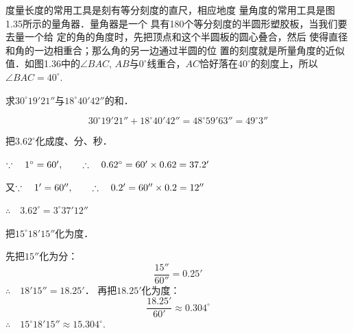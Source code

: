 度量长度的常用工具是刻有等分刻度的直尺，相应地度
量角度的常用工具是图1.35所示的量角器．量角器是一个
具有180个等分刻度的半圆形塑胶板，当我们要去量一个给
定的角的角度时，先把顶点和这个半圆板的圆心叠合，然后
使得直径和角的一边相重合；那么角的另一边通过半圆的位
置的刻度就是所量角度的近似值．如图1.36中的$\angle BAC$,
$AB$与$0^{\circ}$线重合，$AC$恰好落在$40^{\circ}$的刻度上，所以$\angle BAC=40^{\circ}$.

\begin{figure}[htp]
	\centering
{}	
	\caption{}
\end{figure}

\begin{example}
	求$30^{\circ}19'21''$与$18^{\circ}40'42''$的和．
\end{example}

\begin{solution}
\[30^{\circ}19'21''+18^{\circ}40'42''=48^{\circ}59'63''=49^{\circ}3''\]
\end{solution}

\begin{example}
	把$3.62^{\circ}$化成度、分、秒．
\end{example}

\begin{solution}
$\because\quad 1^{\circ}=60',\qquad \therefore\quad 0.62^{\circ}=60'\times 0.62=37.2'$

又$\because\quad 1'=60'',\qquad \therefore\quad 0.2'=60''\times 0.2=12''$

$\therefore\quad 3.62^{\circ}=3^{\circ}37'12''$
\end{solution}

\begin{example}
	把$15^{\circ}18'15''$化为度．
\end{example}


\begin{solution}
	先把$15''$化为分：
\[\frac{15''}{60''}=0.25'\]
$\therefore\quad 18'15''=18.25'$．
再把$18.25'$化为度：
\[\frac{18.25'}{60'}\approx 0.304^{\circ}\]
$\therefore\quad 15^{\circ}18'15''\approx 15.304^{\circ}$.
\end{solution}

